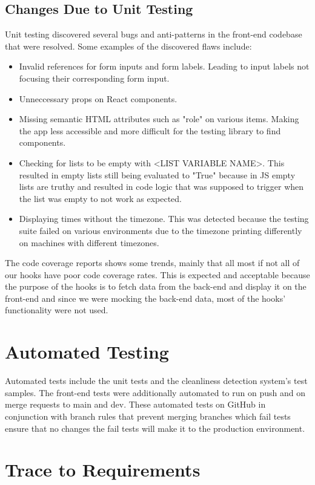 \documentclass[12pt, titlepage]{article}
\begin{document}
\subsection{Changes Due to Unit Testing}
Unit testing discovered several bugs and anti-patterns in the front-end codebase that were resolved. Some examples of the discovered flaws include:
\begin{itemize}
\item Invalid references for form inputs and form labels. Leading to input labels not focusing their corresponding form input.
\item Unneccessary props on React components.
\item Missing semantic HTML attributes such as "role" on various items. Making the app less accessible and more difficult for the testing library to find components.
\item Checking for lists to be empty with <LIST VARIABLE NAME>. This resulted in empty lists still being evaluated to "True" because in JS empty lists are truthy and resulted in code logic that was supposed to trigger when the list was empty to not work as expected.
\item Displaying times without the timezone. This was detected because the testing suite failed on various environments due to the timezone printing differently on machines with different timezones.
\end{itemize}
The code coverage reports shows some trends, mainly that all most if not all of our hooks have poor code coverage rates. This is expected and acceptable because the purpose of the hooks is to fetch data from the back-end and display it on the front-end and since we were mocking the back-end data, most of the hooks' functionality were not used.

\section{Automated Testing}
Automated tests include the unit tests and the cleanliness detection system's test samples. The front-end tests were additionally automated to run on push and on merge requests to main and dev. These automated tests on GitHub in conjunction with branch rules that prevent merging branches which fail tests ensure that no changes the fail tests will make it to the production environment.
		
\section{Trace to Requirements}
		
\end{document}
